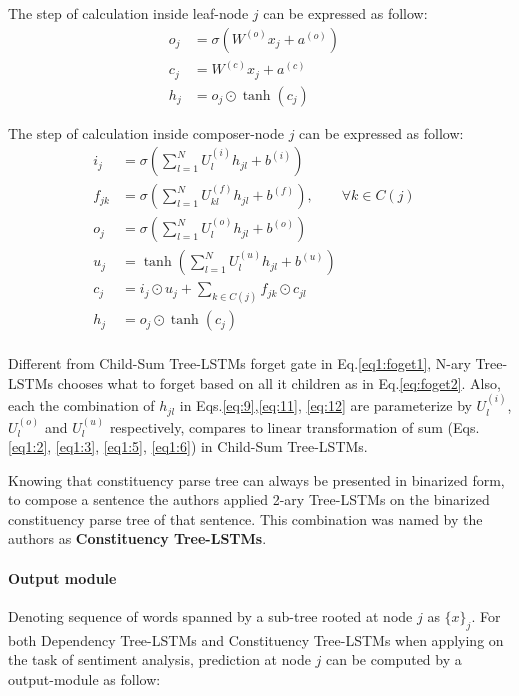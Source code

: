 The step of calculation inside leaf-node \(j\) can be expressed as follow:
\begin{align}
	o_j &= \sigma{\left( W^{(o)} x_j + a^{\left(o\right)}\right)} & \\
   	c_j &= W^{(c)} x_j + a^{(c)} & \\
	h_j &= o_j \odot \tanh{\left(c_j\right)} &
\end{align}

The step of calculation inside composer-node \(j\) can be expressed as follow:
\begin{align}
  	i_j &= \sigma{ \left(\sum_{l=1}^{N}U_l^{(i)} h_{jl} + b^{(i)} \right) } &\label{eq:9}\\
  	f_{jk} &= \sigma{\left(\sum_{l=1}^{N}U_{kl}^{\left(f\right)} h_{jl} + b^{\left(f\right)}\right)}, \qquad  \forall k \in C(j) & \label{eq:foget2}\\ 
  	o_j &= \sigma{\left( \sum_{l=1}^{N}U_l^{\left(o\right)} h_{jl} + b^{\left(o\right)}\right)} &\label{eq:11}\\
  	u_j &= \tanh{\left( \sum_{l=1}^{N}U_l^{\left(u\right)} h_{jl} + b^{\left(u\right)}\right)} &\label{eq:12}\\
   	c_j &= i_j \odot u_j + \sum_{k \in C\left(j\right)} f_{jk} \odot c_{jl} & \\
	h_j &= o_j \odot \tanh{\left(c_j\right)} & \\
\end{align}

Different from Child-Sum Tree-LSTMs forget gate in Eq.\eqref{eq1:foget1}, N-ary Tree-LSTMs chooses what to forget based on all it children as in Eq.\eqref{eq:foget2}. 
Also, each the combination of \(h_{jl}\) in Eqs.\eqref{eq:9},\eqref{eq:11}, \eqref{eq:12} are parameterize by \(U_l^{(i)}\), \(U_l^{(o)}\) and \(U_l^{(u)}\) respectively, compares to linear transformation of sum (Eqs.\eqref{eq1:2}, \eqref{eq1:3}, \eqref{eq1:5}, \eqref{eq1:6}) in Child-Sum Tree-LSTMs.

Knowing that constituency parse tree can always be presented in binarized form, to compose a sentence the authors applied 2-ary Tree-LSTMs on the binarized constituency parse tree of that sentence. 
This combination was named by the authors as \textbf{Constituency Tree-LSTMs}\cite{treeLSTM}.

\paragraph{Output module} Denoting sequence of words spanned by a sub-tree rooted at node \(j\) as \(\{x\}_j\). 
For both Dependency Tree-LSTMs and Constituency Tree-LSTMs when applying on the task of sentiment analysis, prediction at node \(j\) can be computed by a output-module as follow\cite{treeLSTM}:

